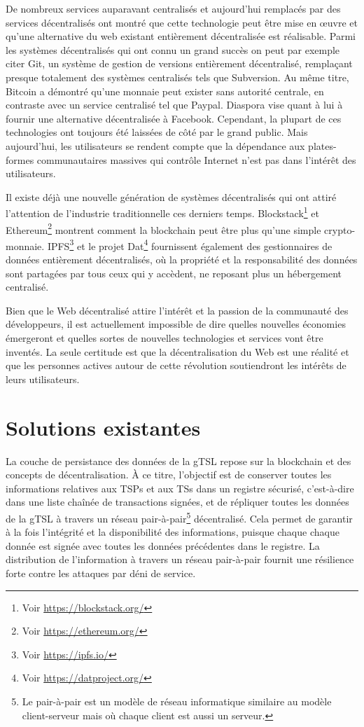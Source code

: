 \documentclass{tnreport}
\begin{document}
De nombreux services auparavant centralisés et aujourd'hui remplacés par des services décentralisés ont montré que cette technologie peut être mise en œuvre et qu'une alternative du web existant entièrement décentralisée est réalisable. 
Parmi les systèmes décentralisés qui ont connu un grand succès on peut par exemple citer Git, un système de gestion de versions entièrement décentralisé, remplaçant presque totalement des systèmes centralisés tels que Subversion. 
Au même titre, Bitcoin a démontré qu'une monnaie peut exister sans autorité centrale, en contraste avec un service centralisé tel que Paypal. 
Diaspora vise quant à lui à fournir une alternative décentralisée à Facebook.
Cependant, la plupart de ces technologies ont toujours été laissées de côté par le grand public. Mais aujourd'hui, les utilisateurs se rendent compte que la dépendance aux plates-formes communautaires massives qui contrôle Internet n'est pas dans l'intérêt des utilisateurs.

Il existe déjà une nouvelle génération de systèmes décentralisés qui ont attiré l'attention de l'industrie traditionnelle ces derniers temps.
Blockstack\footnote{Voir \url{https://blockstack.org/}} et Ethereum\footnote{Voir \url{https://ethereum.org/}} montrent comment la blockchain peut être plus qu'une simple crypto-monnaie. IPFS\footnote{Voir \url{https://ipfs.io/}} et le projet Dat\footnote{Voir \url{https://datproject.org/}} fournissent également des gestionnaires de données entièrement décentralisés, où la propriété et la responsabilité des données sont partagées par tous ceux qui y accèdent, ne reposant plus un hébergement centralisé.

Bien que le Web décentralisé attire l'intérêt et la passion de la communauté des développeurs, il est actuellement impossible de dire quelles nouvelles économies émergeront et quelles sortes de nouvelles technologies et services vont être inventés. La seule certitude est que la décentralisation du Web est une réalité et que les personnes actives autour de cette révolution soutiendront les intérêts de leurs utilisateurs.

\section{Solutions existantes}
\label{sec:solutions}

La couche de persistance des données de la gTSL repose sur la blockchain et des concepts de décentralisation. À ce titre, l'objectif est de conserver toutes les informations relatives aux TSPs et aux TSs dans un registre sécurisé, c'est-à-dire dans une liste chaînée de transactions signées, et de répliquer toutes les données de la gTSL à travers un réseau pair-à-pair\footnote{Le pair-à-pair est un modèle de réseau informatique similaire au modèle client-serveur mais où chaque client est aussi un serveur.} décentralisé.
Cela permet de garantir à la fois l'intégrité et la disponibilité des informations, puisque chaque chaque donnée est signée avec toutes les données précédentes dans le registre. La distribution de l'information à travers un réseau pair-à-pair fournit une résilience forte contre les attaques par déni de service.
\end{document}
